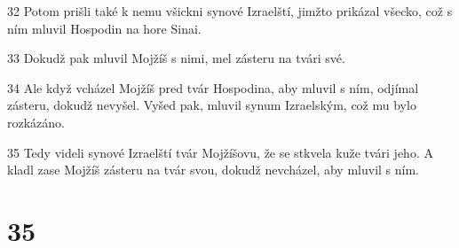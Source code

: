 \par 32 Potom prišli také k nemu všickni synové Izraelští, jimžto prikázal všecko, což s ním mluvil Hospodin na hore Sinai.
\par 33 Dokudž pak mluvil Mojžíš s nimi, mel zásteru na tvári své.
\par 34 Ale když vcházel Mojžíš pred tvár Hospodina, aby mluvil s ním, odjímal zásteru, dokudž nevyšel. Vyšed pak, mluvil synum Izraelským, což mu bylo rozkázáno.
\par 35 Tedy videli synové Izraelští tvár Mojžíšovu, že se stkvela kuže tvári jeho. A kladl zase Mojžíš zásteru na tvár svou, dokudž nevcházel, aby mluvil s ním.

\chapter{35}

